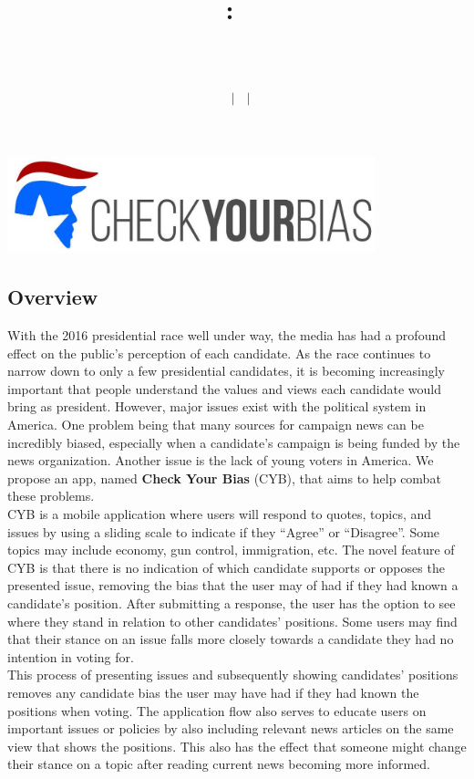 \documentclass{article}
\title{
    \vspace{2in}
    \textmd{\textbf{\hmwkClass:\ \hmwkTitle}}\\
    \vspace{0.1in}\large{\textit{\hmwkClassInstructor\ \hmwkClassTime}}\\
    \author{\textbf{\hmwkAuthorName\ $\vert$ \hmwkAuthorCSE\ $\vert$ \hmwkAuthorId}}
}
\date{}
\begin{document}
\pagebreak

\begin{minipage}{\linewidth}
    \centering
    \includegraphics[width=0.80\textwidth]{logo.jpg}
\end{minipage}

\subsection{Overview}

With the 2016 presidential race well under way, the media has had a profound effect on the public's perception of each candidate. As the race continues to narrow down to only a few presidential candidates, it is becoming increasingly important that people understand the values and views each candidate would bring as president. However, major issues exist with the political system in America. One problem being that many sources for campaign news can be incredibly biased, especially when a candidate's campaign is being funded by the news organization. Another issue is the lack of young voters in America. We propose an app, named \textbf{Check Your Bias} (CYB), that aims to help combat these problems.\\

CYB is a mobile application where users will respond to quotes, topics, and issues by using a sliding scale to indicate if they ``Agree'' or ``Disagree''. Some topics may include economy, gun control, immigration, etc. The novel feature of CYB is that there is no indication of which candidate supports or opposes the presented issue, removing the bias that the user may of had if they had known a candidate's position. After submitting a response, the user has the option to see where they stand in relation to other candidates' positions. Some users may find that their stance on an issue falls more closely towards a candidate they had no intention in voting for.\\ 

This process of presenting issues and subsequently showing candidates' positions removes any candidate bias the user may have had if they had known the positions when voting. The application flow also serves to educate users on important issues or policies by also including relevant news articles on the same view that shows the positions. This also has the effect that someone might change their stance on a topic after reading current news becoming more informed.
\vspace{-5px}
\end{document}
